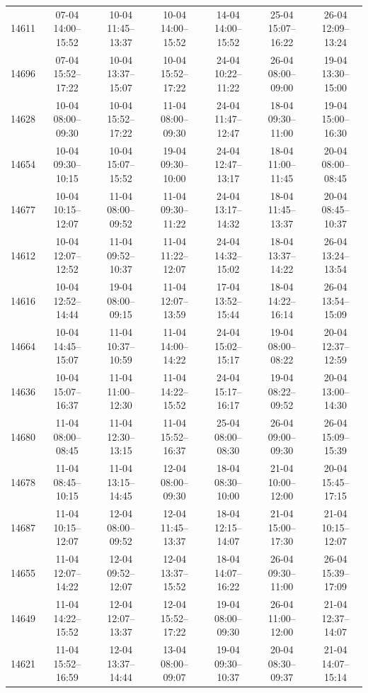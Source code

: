 \begin{table}[htbp]
\begin{tabular}{|r|c|c|c|c|c|c|}
14611 & 07-04 14:00--15:52 & 10-04 11:45--13:37 & 10-04 14:00--15:52 & 14-04 14:00--15:52 & 25-04 15:07--16:22 & 26-04 12:09--13:24 \\ 
14696 & 07-04 15:52--17:22 & 10-04 13:37--15:07 & 10-04 15:52--17:22 & 24-04 10:22--11:22 & 26-04 08:00--09:00 & 19-04 13:30--15:00 \\ 
14628 & 10-04 08:00--09:30 & 10-04 15:52--17:22 & 11-04 08:00--09:30 & 24-04 11:47--12:47 & 18-04 09:30--11:00 & 19-04 15:00--16:30 \\ 
14654 & 10-04 09:30--10:15 & 10-04 15:07--15:52 & 19-04 09:30--10:00 & 24-04 12:47--13:17 & 18-04 11:00--11:45 & 20-04 08:00--08:45 \\ 
14677 & 10-04 10:15--12:07 & 11-04 08:00--09:52 & 11-04 09:30--11:22 & 24-04 13:17--14:32 & 18-04 11:45--13:37 & 20-04 08:45--10:37 \\ 
14612 & 10-04 12:07--12:52 & 11-04 09:52--10:37 & 11-04 11:22--12:07 & 24-04 14:32--15:02 & 18-04 13:37--14:22 & 26-04 13:24--13:54 \\ 
14616 & 10-04 12:52--14:44 & 19-04 08:00--09:15 & 11-04 12:07--13:59 & 17-04 13:52--15:44 & 18-04 14:22--16:14 & 26-04 13:54--15:09 \\ 
14664 & 10-04 14:45--15:07 & 11-04 10:37--10:59 & 11-04 14:00--14:22 & 24-04 15:02--15:17 & 19-04 08:00--08:22 & 20-04 12:37--12:59 \\ 
14636 & 10-04 15:07--16:37 & 11-04 11:00--12:30 & 11-04 14:22--15:52 & 24-04 15:17--16:17 & 19-04 08:22--09:52 & 20-04 13:00--14:30 \\ 
14680 & 11-04 08:00--08:45 & 11-04 12:30--13:15 & 11-04 15:52--16:37 & 25-04 08:00--08:30 & 26-04 09:00--09:30 & 26-04 15:09--15:39 \\ 
14678 & 11-04 08:45--10:15 & 11-04 13:15--14:45 & 12-04 08:00--09:30 & 18-04 08:30--10:00 & 21-04 10:00--12:00 & 20-04 15:45--17:15 \\ 
14687 & 11-04 10:15--12:07 & 12-04 08:00--09:52 & 12-04 11:45--13:37 & 18-04 12:15--14:07 & 21-04 15:00--17:30 & 21-04 10:15--12:07 \\ 
14655 & 11-04 12:07--14:22 & 12-04 09:52--12:07 & 12-04 13:37--15:52 & 18-04 14:07--16:22 & 26-04 09:30--11:00 & 26-04 15:39--17:09 \\ 
14649 & 11-04 14:22--15:52 & 12-04 12:07--13:37 & 12-04 15:52--17:22 & 19-04 08:00--09:30 & 26-04 11:00--12:00 & 21-04 12:37--14:07 \\ 
14621 & 11-04 15:52--16:59 & 12-04 13:37--14:44 & 13-04 08:00--09:07 & 19-04 09:30--10:37 & 20-04 08:30--09:37 & 21-04 14:07--15:14 \\ 

\end{tabular}
\end{table}

